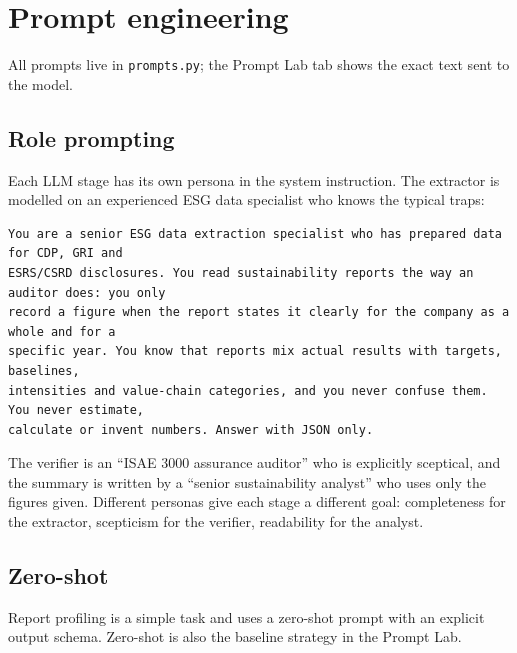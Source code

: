 \documentclass[11pt,a4paper]{article}
\newcommand{\code}[1]{\texttt{\small #1}}
\begin{document}
\section{Prompt engineering}\label{sec:prompts}
All prompts live in \code{prompts.py}; the Prompt Lab tab shows the exact text sent to the model.

\subsection{Role prompting}
Each LLM stage has its own persona in the system instruction. The extractor is modelled on an experienced
ESG data specialist who knows the typical traps:
\begin{lstlisting}[style=prompt]
You are a senior ESG data extraction specialist who has prepared data for CDP, GRI and
ESRS/CSRD disclosures. You read sustainability reports the way an auditor does: you only
record a figure when the report states it clearly for the company as a whole and for a
specific year. You know that reports mix actual results with targets, baselines,
intensities and value-chain categories, and you never confuse them. You never estimate,
calculate or invent numbers. Answer with JSON only.
\end{lstlisting}
The verifier is an ``ISAE 3000 assurance auditor'' who is explicitly sceptical, and the summary is written by
a ``senior sustainability analyst'' who uses only the figures given. Different personas give each stage a
different goal: completeness for the extractor, scepticism for the verifier, readability for the analyst.

\subsection{Zero-shot}
Report profiling is a simple task and uses a zero-shot prompt with an explicit output schema. Zero-shot
is also the baseline strategy in the Prompt Lab.
\end{document}
